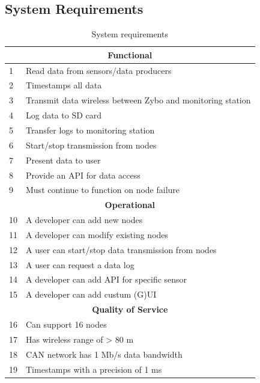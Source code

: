 \subsection{System Requirements} %
\label{sec:system_requirements}
\begin{table}[H]
\centering
\caption{System requirements}
\label{tab:requirements}

\begin{tabular}{ |p{0.3cm}|p{10.5cm}| }
\hline
\multicolumn{2}{|c|}{\textbf{Functional}}\\
\hline
1 & Read data from sensors/data producers 				\\
2 & Timestamps all data 								\\
3 & Transmit data wireless between Zybo and monitoring station	\\
4 & Log data to SD card 								\\
5 & Transfer logs to monitoring station 								\\
6 & Start/stop transmission from nodes 					\\
7 & Present data to user								\\
8 & Provide an API for data access						\\
9 & Must continue to function on node failure			\\

\hline
\multicolumn{2}{|c|}{\textbf{Operational}}\\
\hline	
10 & A developer can add new nodes 										 \\
11 & A developer can modify existing nodes 								 \\
12 & A user can start/stop data transmission from nodes					 \\
13 & A user can request a data log 										 \\
14 & A developer can add API for specific sensor 						 \\
15 & A developer can add custum (G)UI									 \\


\hline
\multicolumn{2}{|c|}{\textbf{Quality of Service}}\\
\hline	
16 & Can support 16 nodes							 					\\
17 & Has wireless range of > 80 m						 				\\
18 & CAN network has 1 Mb/s data bandwidth			 					\\
19 & Timestamps with a precision of 1 ms 			 					\\


\end{tabular}
\end{table}
